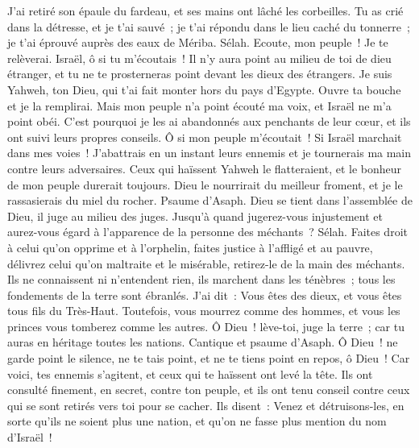 \begin{multicols}{2}
J'ai retiré son épaule du fardeau, et ses mains ont lâché les corbeilles.
Tu as crié dans la détresse, et je t'ai sauvé~; je t'ai répondu dans le lieu caché du tonnerre~; je t'ai éprouvé auprès des eaux de Mériba. Sélah.
Ecoute, mon peuple~! Je te relèverai. Israël, ô si tu m'écoutais~!
 Il n'y aura point au milieu de toi de dieu étranger, et tu ne te prosterneras point devant les dieux des étrangers.
Je suis Yahweh, ton Dieu, qui t'ai fait monter hors du pays d'Egypte. Ouvre ta bouche et je la remplirai.
Mais mon peuple n'a point écouté ma voix, et Israël ne m'a point obéi.
C'est pourquoi je les ai abandonnés aux penchants de leur cœur, et ils ont suivi leurs propres conseils.
Ô si mon peuple m'écoutait~! Si Israël marchait dans mes voies~!
J'abattrais en un instant leurs ennemis et je tournerais ma main contre leurs adversaires.
Ceux qui haïssent Yahweh le flatteraient, et le bonheur de mon peuple durerait toujours.
Dieu le nourrirait du meilleur froment, et je le rassasierais du miel du rocher.
\VerseOne{}Psaume d'Asaph. Dieu se tient dans l'assemblée de Dieu, il juge au milieu des juges.
Jusqu'à quand jugerez-vous injustement et aurez-vous égard à l'apparence de la personne des méchants~? Sélah.
Faites droit à celui qu'on opprime et à l'orphelin, faites justice à l'affligé et au pauvre,
délivrez celui qu'on maltraite et le misérable, retirez-le de la main des méchants.
Ils ne connaissent ni n'entendent rien, ils marchent dans les ténèbres~; tous les fondements de la terre sont ébranlés.
J'ai dit~: Vous êtes des dieux, et vous êtes tous fils du Très-Haut.
Toutefois, vous mourrez comme des hommes, et vous les princes vous tomberez comme les autres.
Ô Dieu~! lève-toi, juge la terre~; car tu auras en héritage toutes les nations.
\VerseOne{}Cantique et psaume d'Asaph.
Ô Dieu~! ne garde point le silence, ne te tais point, et ne te tiens point en repos, ô Dieu~!
Car voici, tes ennemis s'agitent, et ceux qui te haïssent ont levé la tête.
Ils ont consulté finement, en secret, contre ton peuple, et ils ont tenu conseil contre ceux qui se sont retirés vers toi pour se cacher.
Ils disent~: Venez et détruisons-les, en sorte qu'ils ne soient plus une nation, et qu'on ne fasse plus mention du nom d'Israël~!

\end{multicols}
